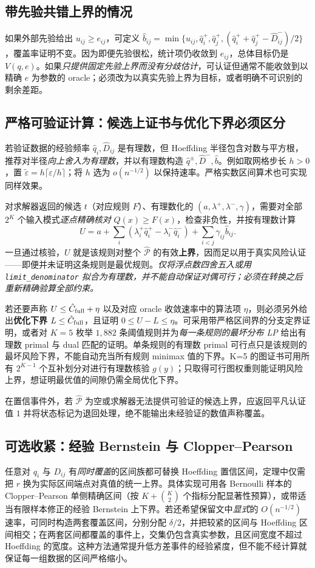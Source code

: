 \documentclass[11pt,a4paper]{ctexart}
\theoremstyle{definition}
\newcommand{\calP}{\mathcal P}
\begin{document}
\subsection{带先验共错上界的情况}
如果外部先验给出 $u_{ij}\ge e_{ij}$，可定义
$\hat b_{ij}=\min\{u_{ij},\hat q_i^+,\hat q_j^+,(\hat q_i^++\hat q_j^+-\hat D_{ij}^-)/2\}$，覆盖率证明不变。因为即便先验很松，统计项仍收敛到 $e_{ij}$，总体目标仍是 $V(q,e)$。如果\emph{只提供固定先验上界而没有分歧估计}，可认证但通常不能收敛到以精确 $e$ 为参数的 oracle；必须改为以真实先验上界为目标，或者明确不可识别的剩余差距。

\subsection{严格可验证计算：候选上证书与优化下界必须区分}\label{subsec:rigor}
若验证数据的经验频率 $\hat q_i,\hat D_{ij}$ 是有理数，但 Hoeffding 半径包含对数与平方根，推荐对半径\emph{向上舍入为有理数}，并以有理数构造 $\hat q^\pm,\hat D^-,\hat b$。例如取网格步长 $h>0$，置 $\tilde\varepsilon= h\lceil \varepsilon/h\rceil$；将 $h$ 选为 $o(n^{-1/2})$ 以保持速率。严格实数区间算术也可实现同样效果。

对求解器返回的候选 $t$（对应规则 $F$）、有理数化的 $(a,\lambda^+,\lambda^-,\gamma)$，需要对全部 $2^K$ 个输入模式\emph{逐点精确核对} $Q(x)\ge F(x)$，检查非负性，并按有理数计算
\[
U=a+\sum_i(\lambda_i^+\hat q_i^+-\lambda_i^-\hat q_i^-)+\sum_{i<j}\gamma_{ij}\hat b_{ij}.
\]
一旦通过核验，$U$ 就是该规则对整个 $\widehat{\calP}$ 的有效\textbf{上界}，因而足以用于真实风险认证——即便并未证明这条规则是最优规则。\emph{仅将浮点数四舍五入或用 \texttt{limit\_denominator} 拟合为有理数，并不能自动保证对偶可行；必须在转换之后重新精确验算全部约束。}

若还要声称 $U\le\hat C_{\rm full}+\eta$ 以及对应 oracle 收敛速率中的算法项 $\eta$，则必须另外给出\textbf{优化下界} $L\le\hat C_{\rm full}$，且证明 $0\le U-L\le\eta$。可采用带严格区间界的分支定界证明，或者对 $K=5$ 枚举 $1{,}882$ 条阈值规则并为\emph{每一条规则的最坏分布 LP} 给出有理数 primal 与 dual 匹配的证明。单条规则的有理数 primal 可行点只是该规则的最坏风险下界，不能自动充当所有规则 minimax 值的下界。K=5 的图证书可用所有 $2^{K-1}$ 个互补划分对进行有理数核验 $g(y)$；只取得可行图权重则能证明风险上界，想证明最优值的间隙仍需全局优化下界。

在置信事件外，若 $\widehat{\calP}$ 为空或求解器无法提供可验证的候选上界，应返回平凡认证值 $1$ 并将状态标记为退回处理，绝不能输出未经验证的数值声称覆盖。

\subsection{可选收紧：经验 Bernstein 与 Clopper--Pearson}
任意对 $q_i$ 与 $D_{ij}$ 有\emph{同时覆盖}的区间族都可替换 Hoeffding 置信区间，定理中仅需把 $r$ 换为实际区间端点对真值的统一上界。具体实现可用各 Bernoulli 样本的 Clopper--Pearson 单侧精确区间（按 $K+\binom K2$ 个指标分配显著性预算），或带适当有限样本修正的经验 Bernstein 上下界。若还希望保留文中\emph{显式}的 $O(n^{-1/2})$ 速率，可同时构造两套覆盖区间，分别分配 $\delta/2$，并把较紧的区间与 Hoeffding 区间相交；在两套区间都覆盖的事件上，交集仍包含真实参数，且区间宽度不超过 Hoeffding 的宽度。这种方法通常提升低方差事件的经验紧度，但不能不经计算就保证每一组数据的区间严格缩小。
\end{document}
